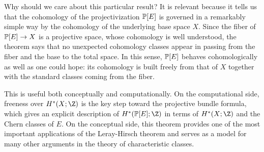 Why should we care about this particular result?
It is relevant because it tells us that the cohomology of the projectivization $\P[E]$ is governed in a remarkably simple way by the cohomology of the underlying base space $X$. Since the fiber of $\P[E]\to X$ is a projective space, whose cohomology is well understood, the theorem says that no unexpected cohomology classes appear in passing from the fiber and the base to the total space. In this sense, $\P[E]$ behaves cohomologically as well as one could hope: its cohomology is built freely from that of $X$ together with the standard classes coming from the fiber.

This is useful both conceptually and computationally. On the computational side, freeness over $H^*(X;\Z)$ is the key step toward the projective bundle formula, which gives an explicit description of $H^*(\P[E];\Z)$ in terms of $H^*(X;\Z)$ and the Chern classes of $E$. On the conceptual side, this theorem provides one of the most important applications of the Leray-Hirsch theorem and serves as a model for many other arguments in the theory of characteristic classes.
